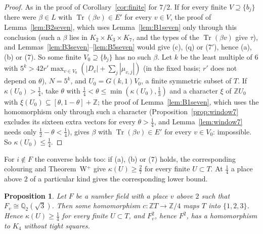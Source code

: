 \documentclass[11pt,a4paper]{amsart}
\newtheorem{proposition}{Proposition}
\theoremstyle{remark}
\newcommand{\Q}{\mathbb{Q}}
\newcommand{\Z}{\mathbb{Z}}
\newcommand{\Tr}{\operatorname{Tr}}
\begin{document}
\begin{proof}
As in the proof of Corollary~\ref{cor:finite} for $7/2$. If for every finite $V\supseteq\{b_j\}$ there were
$\beta\in L$ with $\Tr(\beta v)\in E'$ for every $v\in V$, the proof of Lemma~\ref{lem:B2seven}, which uses
Lemma~\ref{lem:B1seven} only through this conclusion (such a $\beta$ lies in $K_2\times K_3\times K_7$, and the
types of the $\Tr(\beta v)$ give $\tau$), and Lemmas~\ref{lem:B3seven}--\ref{lem:B5seven} would give (c), (q) or
(7$'$), hence (a), (b) or (7). So some finite $V_0\supseteq\{b_j\}$ has no such $\beta$. Let $k$ be the least
multiple of $6$ with $5^k>42r'\max_{v\in V_0}(|D_v|+\sum_j|\mu_{v,j}|)$ (in the fixed basis; $r'$ does not depend
on $\theta$), $N=5^k$, and $U_0=G(k,1)V_0$, a finite symmetric subset of $T$. If $\kappa(U_0)>\frac14$, take $\theta$
with $\frac14<\theta\le\min(\kappa(U_0),\frac13)$ and a character $\xi$ of $\Z U_0$ with
$\xi(U_0)\subseteq[\theta,1-\theta]+\Z$; the proof of Lemma~\ref{lem:B1seven}, which uses the homomorphism only
through such a character (Proposition~\ref{prop:window7} excludes its sixteen extra vectors for every
$\theta>\frac14$, and Lemma~\ref{lem:window7} needs only $\frac12-\theta<\frac14$), gives $\beta$ with
$\Tr(\beta v)\in E'$ for every $v\in V_0$: impossible. So $\kappa(U_0)\le\frac14$.
\end{proof}

For $i\notin F$ the converse holds too: if (a), (b) or (7) holds, the corresponding colouring and Theorem~W$^+$ give
$\kappa(U)\ge\frac27$ for every finite $U\subset T$.
At $\frac14$ a place above $2$ of a particular kind gives the corresponding lower bound.

\begin{proposition}\label{prop:quarterchar}
Let $F$ be a number field with a place $v$ above $2$ such that $F_v\cong\Q_2(\sqrt3)$. Then some homomorphism
$c\colon\Z T\to\Z/4$ maps $T$ into $\{1,2,3\}$. Hence $\kappa(U)\ge\frac14$ for every finite $U\subset T$, and
$F_v^2$, hence $F^2$, has a homomorphism to $K_4$ without tight squares.
\end{proposition}
\end{document}
